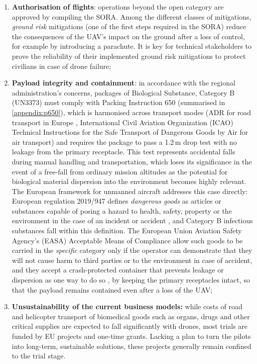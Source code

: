 \begin{enumerate}
    \item \textbf{Authorisation of flights}: operations beyond the open category are approved by compiling the SORA. Among the different classes of mitigations, \textit{ground risk} mitigations (one of the first steps required in the SORA) reduce the consequences of the UAV's impact on the ground after a loss of control, for example by introducing a parachute. It is key for technical stakeholders to prove the reliability of their implemented ground risk mitigations to protect civilians in case of drone failure;
    
    \item \textbf{Payload integrity and containment}: in accordance with the regional administration's concerns, packages of Biological Substance, Category B (UN3373) must comply with Packing Instruction 650 (summarised in \cref{appendix:p650}), which is harmonised across transport modes (ADR for road transport in Europe \cite{ADR_2025}, International Civil Aviation Organization (ICAO) Technical Instructions for the Safe Transport of Dangerous Goods by Air \cite{ICAO_TI_2025} for air transport) and requires the package to pass a 1.2\,m drop test with no leakage from the primary receptacle. This test represents accidental falls during manual handling and transportation, which loses its significance in the event of a free-fall from ordinary mission altitudes as the potential for biological material dispersion into the environment becomes highly relevant. The European framework for unmanned aircraft addresses this case directly: European regulation 2019/947 defines \textit{dangerous goods} as articles or substances capable of posing a hazard to health, safety, property or the environment in the case of an incident or accident \cite{EU_2019_947}, and Category B infectious substances fall within this definition. The European Union Aviation Safety Agency's (EASA) Acceptable Means of Compliance allow such goods to be carried in the \textit{specific} category only if the operator can demonstrate that they will not cause harm to third parties or to the environment in case of accident, and they accept a crash-protected container that prevents leakage or dispersion as one way to do so \cite{EASA_AMC_947}, by keeping the primary receptacles intact, so that the payload remains contained even after a loss of the UAV;
    
    \item \textbf{Unsustainability of the current business models:} while costs of road and helicopter transport of biomedical goods such as organs, drugs and other critical supplies are expected to fall significantly with drones, most trials are funded by EU projects and one-time grants. Lacking a plan to turn the pilots into long-term, sustainable solutions, these projects generally remain confined to the trial stage. 
\end{enumerate}

